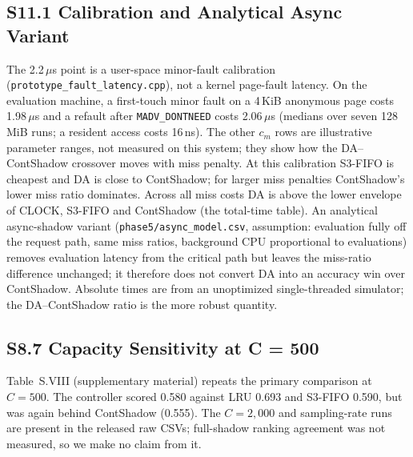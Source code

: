 \documentclass[journal,onecolumn]{IEEEtran}
\begin{document}
\subsection*{S11.1 Calibration and Analytical Async Variant}
The 2.2\,$\mu$s point is a user-space minor-fault calibration
(\texttt{prototype\_fault\_latency.cpp}), not a kernel page-fault latency.
On the evaluation machine, a first-touch minor fault on a 4\,KiB anonymous page
costs 1.98\,$\mu$s and a refault after \texttt{MADV\_DONTNEED} costs
2.06\,$\mu$s (medians over seven 128\,MiB runs; a resident access costs
16\,ns). The other $c_m$ rows are illustrative parameter ranges, not measured
on this system; they show how the DA--ContShadow crossover moves with miss
penalty. At this calibration S3-FIFO is cheapest and DA is close to
ContShadow; for larger miss penalties ContShadow's lower miss ratio dominates.
Across all miss costs DA is above the lower envelope of CLOCK, S3-FIFO and
ContShadow (the total-time table). An analytical async-shadow variant
(\texttt{phase5/async\_model.csv}, assumption: evaluation fully off the
request path, same miss ratios, background CPU proportional to evaluations)
removes evaluation latency from the critical path but leaves the miss-ratio
difference unchanged; it therefore does not convert DA into an accuracy win
over ContShadow. Absolute times are from an unoptimized single-threaded
simulator; the DA--ContShadow ratio is the more robust quantity.


\subsection*{S8.7 Capacity Sensitivity at C = 500}
Table~S.VIII (supplementary material) repeats the primary comparison at $C = 500$. The controller scored
0.580 against LRU 0.693 and S3-FIFO 0.590, but was again behind ContShadow
(0.555). The $C = 2{,}000$ and sampling-rate runs are present in the released
raw CSVs; full-shadow ranking agreement was not measured, so we make no claim
from it.
\end{document}
